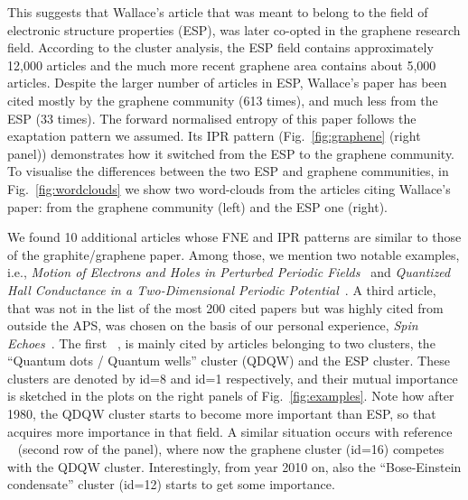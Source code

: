 \documentclass[draft,final]{vutinfth} %
\begin{document}
This suggests that Wallace's article that was meant to belong to the field of electronic structure properties (ESP), was later co-opted in the graphene research field. 
According to the cluster analysis, the ESP field contains approximately 12,000 articles and the much more recent graphene area contains about 5,000 articles. 
Despite the larger number of articles in ESP, Wallace's paper has been cited mostly by the graphene community (613 times), and much less from the  ESP (33 times). 
The forward normalised entropy of this paper follows the exaptation pattern we assumed. 
Its IPR pattern (Fig.~\ref{fig:graphene} (right panel)) demonstrates how it switched from the ESP to the graphene community. 
To visualise the differences between the two ESP and graphene communities, in Fig.~\ref{fig:wordclouds} we show two word-clouds from the articles citing Wallace's paper: from the graphene community  (left) and the ESP one (right). 

We found 10 additional articles whose FNE and IPR patterns are similar to those of the graphite/graphene paper. Among those, we mention two notable examples, i.e., \emph{Motion of Electrons and Holes in Perturbed Periodic Fields}~\cite{electrons_and_holes} and \emph{Quantized Hall Conductance in a Two-Dimensional Periodic Potential}~\cite{quantized_hall}. 
A third article, that was not in the list of the most 200 cited papers but was highly cited from outside the APS, was chosen on the basis of our personal experience, \emph{Spin Echoes}~\cite{spin_echoes}. 
The first ~\cite{electrons_and_holes}, is mainly cited by articles belonging to two clusters,  the ``Quantum dots / Quantum wells'' cluster (QDQW) and the ESP cluster. These clusters are denoted by id=8 and id=1 respectively, and their mutual importance is sketched in the plots on the right panels of Fig.~\ref{fig:examples}.  
Note how after 1980, the QDQW cluster starts to become more important than ESP, so that~\cite{electrons_and_holes} acquires more importance in that field. 
A similar situation occurs with reference ~\cite{quantized_hall} (second row of the panel), where now the graphene cluster (id=16) competes with the QDQW cluster. Interestingly, from year 2010 on, also the ``Bose-Einstein condensate'' cluster (id=12) starts to get some importance.
\end{document}
